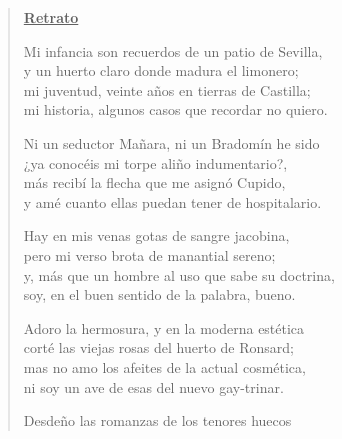 \begin{verse}

\begin{center}

\underline{\bf Retrato}

Mi infancia son recuerdos de un patio de Sevilla, \\


y un huerto claro donde madura el limonero; \\


mi juventud, veinte años en tierras de Castilla; \\


mi historia, algunos casos que recordar no quiero.

\par

Ni un seductor Mañara, ni un Bradomín he sido \\


¿ya conocéis mi torpe aliño indumentario?, \\


más recibí la flecha que me asignó Cupido, \\


y amé cuanto ellas puedan tener de hospitalario.

\par

Hay en mis venas gotas de sangre jacobina, \\


pero mi verso brota de manantial sereno; \\


y, más que un hombre al uso que sabe su doctrina, \\


soy, en el buen sentido de la palabra, bueno.

\par

Adoro la hermosura, y en la moderna estética \\


corté las viejas rosas del huerto de Ronsard; \\


mas no amo los afeites de la actual cosmética, \\


ni soy un ave de esas del nuevo gay-trinar.

\par

Desdeño las romanzas de los tenores huecos \\



\end{center}
\end{verse}
